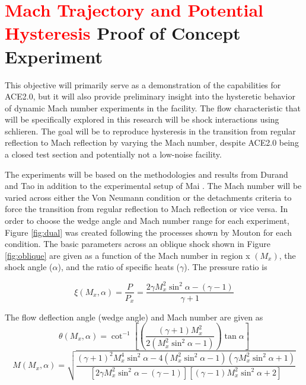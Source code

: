 \section{\textcolor{red}{Mach Trajectory and Potential Hysteresis} Proof of Concept Experiment}

This objective will primarily serve as a demonstration of the capabilities for ACE2.0, but it will also provide preliminary insight into the hysteretic behavior of dynamic Mach number experiments in the facility. The flow characteristic that will be specifically explored in this research will be shock interactions using schlieren. The goal will be to reproduce hysteresis in the transition from regular reflection to Mach reflection by varying the Mach number, despite ACE2.0 being a closed test section and potentially not a low-noise facility. 

The experiments will be based on the methodologies and results from Durand \cite{durand} and Tao \cite{tao} in addition to the experimental setup of Mai \cite{mai-dis}. The Mach number will be varied across either the Von Neumann condition or the detachments criteria to force the transition from regular reflection to Mach reflection or vice versa. In order to choose the wedge angle and Mach number range for each experiment, Figure \ref{fig:dual} was created following the processes shown by Mouton \cite{mouton} for each condition. The basic parameters across an oblique shock shown in Figure \ref{fig:oblique} are given as a function of the Mach number in region x $\left(M_x\right)$, the shock angle ($\alpha$), and the ratio of specific heats ($\gamma$). The pressure ratio is 

\begin{equation}
    \xi \left(M_x,\alpha\right) = \frac{P}{P_x} = \frac{2 \gamma M_x^2 \sin^2{\alpha} - (\gamma-1)}{\gamma+1}
\end{equation}

\noindent The flow deflection angle (wedge angle) and Mach number are given as
\begin{equation}
    \theta \left(M_x,\alpha\right) = \cot^{-1}{\left[ \left(\frac{(\gamma+1) M_x^2}{2\left(M_x^2 \sin^2{\alpha} - 1\right)}\right) \tan{\alpha} \right]}
\end{equation}
\begin{equation}
    M \left(M_x,\alpha\right) = \sqrt{\frac{(\gamma+1)^2 M_x^4 \sin^2{\alpha} - 4\left(M_x^2 \sin^2{\alpha} - 1\right)\left(\gamma M_x^2 \sin^2{\alpha} + 1\right)}{\left[2 \gamma M_x^2 \sin^2{\alpha} - (\gamma-1)\right]\left[(\gamma-1) M_x^2 \sin^2{\alpha} + 2\right]}}
\end{equation}

